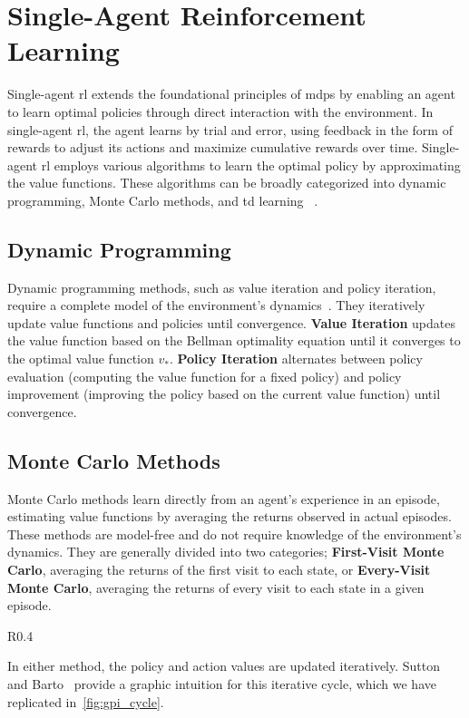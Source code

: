 \section{Single-Agent Reinforcement Learning}%

Single-agent \gls{rl} extends the foundational principles of \glspl{mdp} 
by enabling an agent to learn optimal policies through direct interaction with 
the environment. In single-agent \gls{rl}, the agent learns by trial and error, 
using feedback in the form of rewards to adjust its actions and maximize 
cumulative rewards over time.
Single-agent \gls{rl} employs various algorithms to learn the optimal policy by 
approximating the value functions. These algorithms can be broadly categorized 
into dynamic programming, Monte Carlo methods, and \gls{td} learning~%
\cite{sutton2018}.

    \subsection*{Dynamic Programming}%

Dynamic programming methods, such as value iteration and policy iteration, 
require a complete model of the environment's dynamics~\cite{sutton2018}.
They iteratively update value functions and policies until convergence. 
\textbf{Value Iteration} updates the value function based on the Bellman 
optimality equation until it converges to the optimal value function \(v_*\).
\textbf{Policy Iteration} alternates between policy evaluation 
(computing the value function for a fixed policy) and policy improvement 
(improving the policy based on the current value function) until convergence.

    \subsection*{Monte Carlo Methods}%

Monte Carlo methods learn directly from an agent's experience in an episode, 
estimating value functions by averaging the returns observed in actual episodes.
These methods are model-free and do not require knowledge of the environment's 
dynamics. They are generally divided into two categories; 
\textbf{First-Visit Monte Carlo}, averaging the returns of the first visit to 
each state, or \textbf{Every-Visit Monte Carlo}, averaging the returns of every
visit to each state in a given episode.
%
\begin{wrapfigure}[7]{R}{0.4\textwidth}
    \vspace*{-4em}
    \centering
    \resizebox{0.3\textwidth}{!}{%
        
    }
    \captionsetup{margin=1.2em}
    \caption{Generalized Policy Iteration.}
    \label{fig:gpi_cycle}
\end{wrapfigure}
%
In either method, the policy and action values are updated iteratively.
Sutton and Barto~\cite{sutton2018} provide a graphic intuition for this 
iterative cycle, which we have replicated in~\cref{fig:gpi_cycle}.

